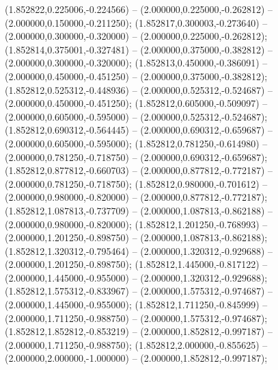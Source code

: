  (1.852822,0.225006,-0.224566) -- (2.000000,0.225000,-0.262812) -- (2.000000,0.150000,-0.211250);
 (1.852817,0.300003,-0.273640) -- (2.000000,0.300000,-0.320000) -- (2.000000,0.225000,-0.262812);
 (1.852814,0.375001,-0.327481) -- (2.000000,0.375000,-0.382812) -- (2.000000,0.300000,-0.320000);
 (1.852813,0.450000,-0.386091) -- (2.000000,0.450000,-0.451250) -- (2.000000,0.375000,-0.382812);
 (1.852812,0.525312,-0.448936) -- (2.000000,0.525312,-0.524687) -- (2.000000,0.450000,-0.451250);
 (1.852812,0.605000,-0.509097) -- (2.000000,0.605000,-0.595000) -- (2.000000,0.525312,-0.524687);
 (1.852812,0.690312,-0.564445) -- (2.000000,0.690312,-0.659687) -- (2.000000,0.605000,-0.595000);
 (1.852812,0.781250,-0.614980) -- (2.000000,0.781250,-0.718750) -- (2.000000,0.690312,-0.659687);
 (1.852812,0.877812,-0.660703) -- (2.000000,0.877812,-0.772187) -- (2.000000,0.781250,-0.718750);
 (1.852812,0.980000,-0.701612) -- (2.000000,0.980000,-0.820000) -- (2.000000,0.877812,-0.772187);
 (1.852812,1.087813,-0.737709) -- (2.000000,1.087813,-0.862188) -- (2.000000,0.980000,-0.820000);
 (1.852812,1.201250,-0.768993) -- (2.000000,1.201250,-0.898750) -- (2.000000,1.087813,-0.862188);
 (1.852812,1.320312,-0.795464) -- (2.000000,1.320312,-0.929688) -- (2.000000,1.201250,-0.898750);
 (1.852812,1.445000,-0.817122) -- (2.000000,1.445000,-0.955000) -- (2.000000,1.320312,-0.929688);
 (1.852812,1.575312,-0.833967) -- (2.000000,1.575312,-0.974687) -- (2.000000,1.445000,-0.955000);
 (1.852812,1.711250,-0.845999) -- (2.000000,1.711250,-0.988750) -- (2.000000,1.575312,-0.974687);
 (1.852812,1.852812,-0.853219) -- (2.000000,1.852812,-0.997187) -- (2.000000,1.711250,-0.988750);
 (1.852812,2.000000,-0.855625) -- (2.000000,2.000000,-1.000000) -- (2.000000,1.852812,-0.997187);
